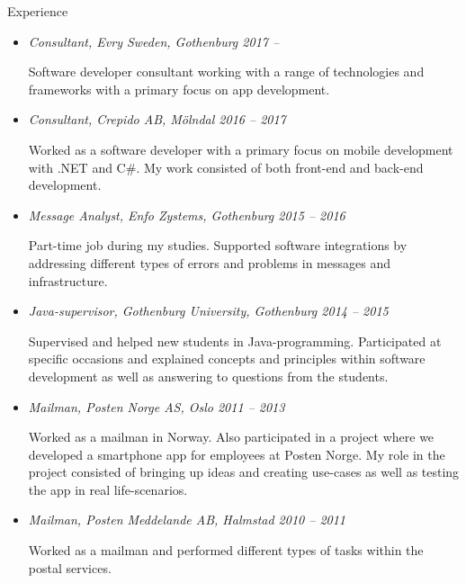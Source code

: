 {\itshape\Large\begin{center}
Experience
\end{center}}

\vspace{12px}

\begin{itemize}
  \item {\itshape Consultant, Evry Sweden, Gothenburg 2017 –}
  
  Software developer consultant working with a range of technologies and 
  frameworks with a primary focus on app development.

  \item {\itshape Consultant, Crepido AB, Mölndal 2016 – 2017}

  Worked as a software developer with a primary focus on mobile development with 
  .NET and C\#. My work consisted of both front-end and back-end development.

  \item {\itshape Message Analyst, Enfo Zystems, Gothenburg 2015 – 2016}

  Part-time job during my studies. Supported software integrations by addressing 
  different types of errors and problems in messages and infrastructure.

  \item {\itshape Java-supervisor, Gothenburg University, Gothenburg 2014 – 2015}

  Supervised and helped new students in Java-programming. Participated at specific 
  occasions and explained concepts and principles within software development as 
  well as answering to questions from the students.

  \item {\itshape Mailman, Posten Norge AS, Oslo 2011 – 2013}
  
  Worked as a mailman in Norway. Also participated in a project where we developed 
  a smartphone app for employees at Posten Norge. My role in the project consisted 
  of bringing up ideas and creating use-cases as well as testing the app in real life-scenarios.

  \item {\itshape Mailman, Posten Meddelande AB, Halmstad 2010 – 2011}
  
  Worked as a mailman and performed different types of tasks within the postal services.

\end{itemize}

\vspace{12px}

